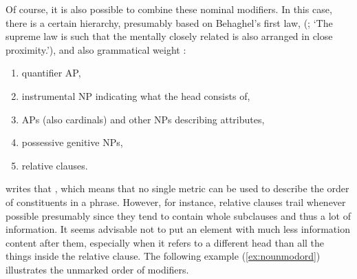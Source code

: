 
\xe

Of course, it is also possible to combine these nominal modifiers. In this
case, there is a certain hierarchy, presumably based on Behaghel's first law,
 (\cite[4]{behaghel1932}; `The supreme law is
such that the mentally closely related is also arranged in close proximity.'), 
and also grammatical weight \citep{wasow1997}:

\begin{enumerate}[noitemsep]
	\item quantifier AP,
	\item instrumental NP indicating what the head consists of,
	\item APs (also cardinals) and other NPs describing attributes,
	\item possessive genitive NPs,
	\item relative clauses.
\end{enumerate}

\citet{wasow1997} writes that , which means
that no single metric can be used to describe the order of constituents in a
phrase. However, for instance, relative clauses trail whenever possible
presumably since they tend to contain whole subclauses and thus a lot of
information. It seems advisable not to put an element with much less 
information content after them, especially when it refers to a different head
than all the things inside the relative clause. The following example 
(\ref{ex:nounmodord}) illustrates the unmarked order of modifiers.

